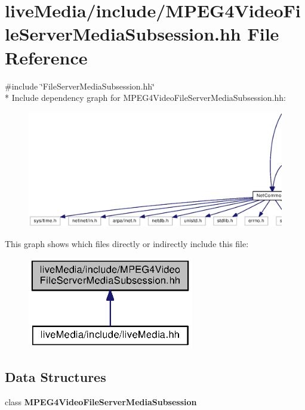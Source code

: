 \section{live\+Media/include/\+M\+P\+E\+G4\+Video\+File\+Server\+Media\+Subsession.hh File Reference}
\label{MPEG4VideoFileServerMediaSubsession_8hh}
{\ttfamily \#include \char`\"{}File\+Server\+Media\+Subsession.\+hh\char`\"{}}\\*
Include dependency graph for M\+P\+E\+G4\+Video\+File\+Server\+Media\+Subsession.\+hh\+:
\nopagebreak
\begin{figure}[H]
\begin{center}
\leavevmode
\includegraphics[width=350pt]{MPEG4VideoFileServerMediaSubsession_8hh__incl}
\end{center}
\end{figure}
This graph shows which files directly or indirectly include this file\+:
\nopagebreak
\begin{figure}[H]
\begin{center}
\leavevmode
\includegraphics[width=205pt]{MPEG4VideoFileServerMediaSubsession_8hh__dep__incl}
\end{center}
\end{figure}
\subsection*{Data Structures}
\begin{DoxyCompactItemize}
\item 
class {\bf M\+P\+E\+G4\+Video\+File\+Server\+Media\+Subsession}
\end{DoxyCompactItemize}
